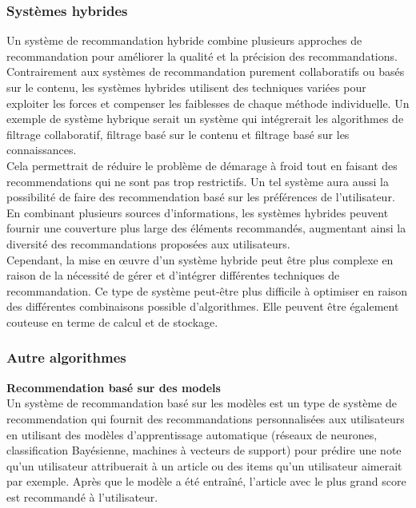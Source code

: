 \documentclass[11pt]{article}
\begin{document}
\subsubsection{Systèmes hybrides}
Un système de recommandation hybride combine plusieurs approches de recommandation pour améliorer la qualité et la précision des recommandations. Contrairement aux systèmes de recommandation purement collaboratifs ou basés sur le contenu, les systèmes hybrides utilisent des techniques variées pour exploiter les forces et compenser les faiblesses de chaque méthode individuelle. Un exemple de système hybrique serait un système qui intégrerait les algorithmes de filtrage collaboratif, filtrage basé sur le contenu et filtrage basé sur les connaissances. \\

Cela permettrait de réduire le problème de démarage à froid tout en faisant des recommendations qui ne sont pas trop restrictifs. Un tel système aura aussi la possibilité de faire des recommendation basé sur les préférences de l'utilisateur.\\

En combinant plusieurs sources d'informations, les systèmes hybrides peuvent fournir une couverture plus large des éléments recommandés, augmentant ainsi la diversité des recommandations proposées aux utilisateurs.\\

Cependant, la mise en œuvre d'un système hybride peut être plus complexe en raison de la nécessité de gérer et d'intégrer différentes techniques de recommandation. Ce type de système peut-être plus difficile à optimiser en raison des différentes combinaisons possible d'algorithmes. Elle peuvent être également couteuse en terme de calcul et de stockage.


\subsubsection{Autre algorithmes}

\textbf{Recommendation basé sur des models}\\
Un système de recommandation basé sur les modèles est un type de système de recommendation qui fournit des recommandations personnalisées aux utilisateurs en utilisant des modèles d’apprentissage automatique (réseaux de neurones, classification Bayésienne, machines à vecteurs de support) pour prédire une note qu’un utilisateur attribuerait à un article ou des items qu'un utilisateur aimerait par exemple. Après que le modèle a été entraîné, l’article avec le plus grand score est recommandé à l’utilisateur.
\end{document}
